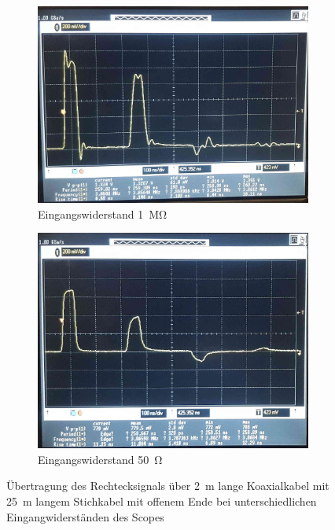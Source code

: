 \documentclass[a4paper,twoside,final]{article}
\begin{document}
\begin{figure}[htp]
    \centering
    \begin{subfigure}{0.45\textwidth}
        \includegraphics[width=\textwidth]{Bilder/Bild3.jpg}
        \caption{Eingangswiderstand \SI{1}{\mega\ohm}}
    \end{subfigure}\hspace{1cm}
    \begin{subfigure}{0.45\textwidth}
        \includegraphics[width=\textwidth]{Bilder/Bild4.jpg}
        \caption{Eingangswiderstand \SI{50}{\ohm}}
    \end{subfigure}
    \caption{Übertragung des Rechtecksignals über \SI{2}{\meter} lange Koaxialkabel mit \SI{25}{\meter} langem Stichkabel mit offenem Ende bei unterschiedlichen Eingangwiderständen des Scopes}
\end{figure}
\end{document}
